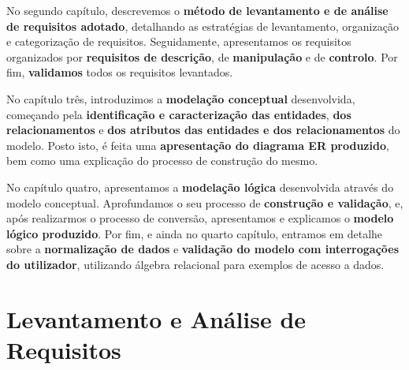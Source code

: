 \documentclass[a4paper,12pt]{scrreprt}
\begin{document}
    No segundo capítulo, descrevemos o \textbf{método de levantamento e de análise de requisitos adotado}, detalhando as estratégias de levantamento, organização e categorização de requisitos. Seguidamente, apresentamos os requisitos organizados por \textbf{requisitos de descrição}, de \textbf{manipulação} e de \textbf{controlo}. Por fim, \textbf{validamos} todos os requisitos levantados.

    No capítulo três, introduzimos a \textbf{modelação conceptual} desenvolvida, começando pela \textbf{identificação e caracterização das entidades}, \textbf{dos relacionamentos} e \textbf{dos atributos das entidades e dos relacionamentos} do modelo. Posto isto, é feita uma \textbf{apresentação do diagrama ER produzido}, bem como uma explicação do processo de construção do mesmo.

    No capítulo quatro, apresentamos a \textbf{modelação lógica} desenvolvida através do modelo conceptual. Aprofundamos o seu processo de \textbf{construção e validação}, e, após realizarmos o processo de conversão, apresentamos e explicamos o \textbf{modelo lógico produzido}.
    Por fim, e ainda no quarto capítulo, entramos em detalhe sobre a \textbf{normalização de dados} e \textbf{validação do modelo com interrogações do utilizador}, utilizando álgebra relacional para exemplos de acesso a dados.



\chapter{Levantamento e Análise de Requisitos}
    \label{requisitos}
\end{document}
